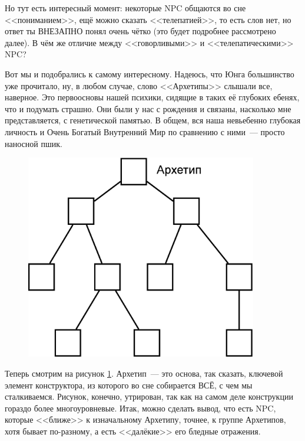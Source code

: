 \documentclass[a5paper,12pt,twoside]{memoir}
\begin{document}
Но тут есть интересный момент: некоторые NPC общаются во сне <<пониманием>>, ещё можно сказать <<телепатией>>, то есть слов нет, но ответ ты ВНЕЗАПНО понял очень чётко (это будет подробнее рассмотрено далее). В чём же отличие между <<говорливыми>> и <<телепатическими>> NPC?

Вот мы и подобрались к самому интересному. Надеюсь, что Юнга большинство уже прочитало, ну, в любом случае, слово <<Архетипы>> слышали все, наверное. Это первоосновы нашей психики, сидящие в таких её глубоких ебенях, что и подумать страшно. Они были у нас с рождения и связаны, насколько мне представляется, с генетической памятью. В общем, вся наша невьебенно глубокая личность и Очень Богатый Внутренний Мир по сравнению с ними~--- просто наносной пшик.
 
\begin{figure}[h!]
\begin{center}
\includegraphics[width=0.9\textwidth]{ris81.png}
\end{center}
\caption{}
\label{archt}
\end{figure}

Теперь смотрим на рисунок \ref{archt}. Архетип~--- это основа, так сказать, ключевой элемент конструктора, из которого во сне собирается ВСЁ, с чем мы сталкиваемся. Рисунок, конечно, утрирован, так как на самом деле конструкции гораздо более многоуровневые. Итак, можно сделать вывод, что есть NPC, которые <<ближе>> к изначальному Архетипу, точнее, к группе Архетипов, хотя бывает по-разному, а есть <<далёкие>> его бледные отражения.
\end{document}
